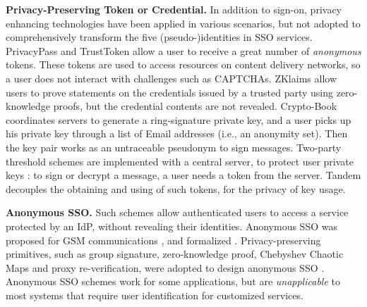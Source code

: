 \noindent\textbf{Privacy-Preserving Token or Credential.}
%
In addition to sign-on, privacy enhancing technologies have been applied in various scenarios,
  but not adopted to comprehensively transform the five (pseudo-)identities in SSO services.
PrivacyPass and TrustToken \cite{privacypass,trusttoken} allow a user to receive a great number of \emph{anonymous} tokens.
 These tokens are used to access resources on content delivery networks,
    so a user does not interact with challenges such as CAPTCHAs.
ZKlaims \cite{zklaim} allow users to prove statements on the credentials issued by a trusted party
    using zero-knowledge proofs,
        but the credential contents are not revealed.
Crypto-Book \cite{crypto-book} coordinates servers to generate a ring-signature private key,
 and a user picks up his private key through a list of Email addresses (i.e., an anonymity set).
 Then the key pair works as an untraceable pseudonym to sign messages.
Two-party threshold schemes are implemented with a central server,
    to protect user private keys \cite{mRSA,ss-rsa}:
    to sign or decrypt a message, a user needs a token from the server.
    Tandem \cite{tandem} decouples the obtaining and using of such tokens,
for the privacy of key usage.


\noindent\textbf{Anonymous SSO.}
Such schemes allow authenticated users to access a service protected by an IdP,
    without revealing their identities.
Anonymous SSO was proposed for GSM communications \cite{ElmuftiWRR08},
    and formalized \cite{WangWS13}.
Privacy-preserving primitives, such as group signature, zero-knowledge proof, Chebyshev Chaotic Maps and proxy re-verification,
     were adopted to design anonymous SSO \cite{WangWS13,HanCSTW18,Lee18,HanCSTWW20}.
Anonymous SSO schemes work for some applications,
    but are \emph{unapplicable} to most systems that require user identification for customized services.

